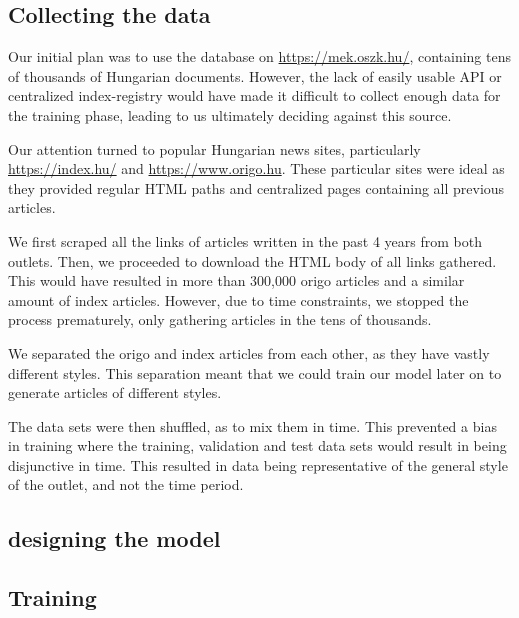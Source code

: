\documentclass[journal]{IEEEtai}
\begin{document}
\subsection{Collecting the data}
Our initial plan was to use the database on \href{https://mek.oszk.hu/}{https://mek.oszk.hu/}, containing tens of thousands of Hungarian documents. However, the lack of easily usable API or centralized index-registry would have made it difficult to collect enough data for the training phase, leading to us ultimately deciding against this source.

Our attention turned to popular Hungarian news sites, particularly \href{https://index.hu/}{https://index.hu/} and \href{https://www.origo.hu}{https://www.origo.hu}. These particular sites were ideal as they provided regular HTML paths and centralized pages containing all previous articles. 

We first scraped all the links of articles written in the past 4 years from both outlets. Then, we proceeded to download the HTML body of all links gathered. This would have resulted in more than 300,000 origo articles and a similar amount of index articles. However, due to time constraints, we stopped the process prematurely, only gathering articles in the tens of thousands.

We separated the origo and index articles from each other, as they have vastly different styles. This separation meant that we could train our model later on to generate articles of different styles. 

The data sets were then shuffled, as to mix them in time. This prevented a bias in training where the training, validation and test data sets would result in being disjunctive in time. This resulted in data being representative of the general style of the outlet, and not the time period. 

\subsection{designing the model}


\subsection{Training}







\end{document}
